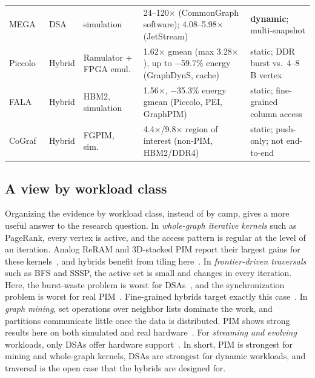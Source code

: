 \documentclass[journal,onecolumn]{IEEEtran}
\begin{document}
\begin{table}[t]
\begin{tabularx}{\textwidth}{@{}L{2.3cm}L{1.1cm}L{3.0cm}YL{4.0cm}@{}}
MEGA~\cite{gao2023mega} & DSA & simulation & 24--120$\times$ (CommonGraph software); 4.08--5.98$\times$ (JetStream) & \textbf{dynamic}; multi-snapshot \\
Piccolo~\cite{shin2025piccolo} & Hybrid & Ramulator + FPGA emul.\ & 1.62$\times$ gmean (max 3.28$\times$), up to $-$59.7\% energy (GraphDynS, cache) & static; DDR burst vs.\ 4--8\,B vertex \\
FALA~\cite{shin2025fala} & Hybrid & HBM2, simulation & 1.56$\times$, $-$35.3\% energy gmean (Piccolo, PEI, GraphPIM) & static; fine-grained column access \\
CoGraf~\cite{yenimol2026cograf} & Hybrid & FGPIM, sim.\ & 4.4$\times$/9.8$\times$ region of interest (non-PIM, HBM2/DDR4) & static; push-only; not end-to-end \\
\bottomrule
\end{tabularx}
\end{table}

\subsection{A view by workload class}
Organizing the evidence by workload class, instead of by camp, gives a more useful answer to the research question. In \emph{whole-graph iterative kernels} such as PageRank, every vertex is active, and the access pattern is regular at the level of an iteration. Analog ReRAM and 3D-stacked PIM report their largest gains for these kernels~\cite{song2018graphr,challapalle2020gaasx,ahn2015tesseract}, and hybrids benefit from tiling here~\cite{shin2025piccolo}. In \emph{frontier-driven traversals} such as BFS and SSSP, the active set is small and changes in every iteration. Here, the burst-waste problem is worst for DSAs~\cite{shin2025piccolo}, and the synchronization problem is worst for real PIM~\cite{gomezluna2022prim,barkhordar2025alphapim}. Fine-grained hybrids target exactly this case~\cite{shin2025fala,yenimol2026cograf}. In \emph{graph mining}, set operations over neighbor lists dominate the work, and partitions communicate little once the data is distributed. PIM shows strong results here on both simulated and real hardware~\cite{besta2021sisa,talati2022ndminer,cai2024pimpam}. For \emph{streaming and evolving} workloads, only DSAs offer hardware support~\cite{rahman2021jetstream,zhao2022tdgraph,gao2023mega}. In short, PIM is strongest for mining and whole-graph kernels, DSAs are strongest for dynamic workloads, and traversal is the open case that the hybrids are designed for.
\end{document}
